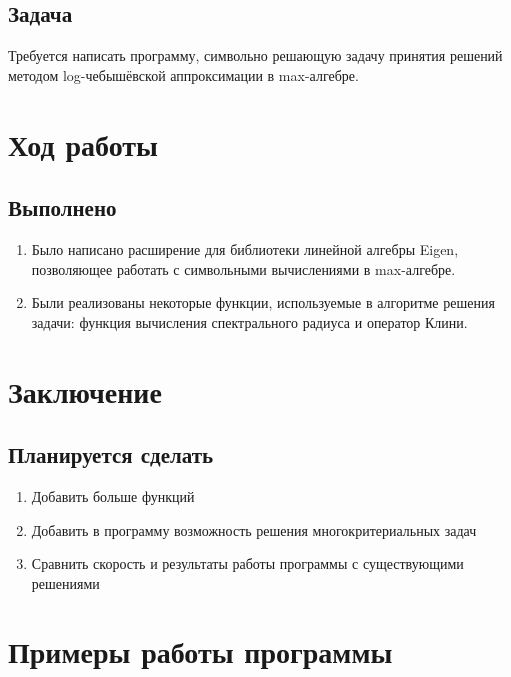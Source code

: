 \documentclass[specialist,
  substylefile = spbu.rtx,
  href,
  colorlinks=true,
  12pt]{disser}
\begin{document}
\section{Задача}
  Требуется написать программу, символьно решающую задачу принятия решений методом log-чебышёвской аппроксимации в max-алгебре.

\chapter{Ход работы}
\section{Выполнено}
  \begin{enumerate}
    \item Было написано расширение для библиотеки линейной алгебры Eigen, позволяющее работать с символьными вычислениями в max-алгебре.
    \item Были реализованы некоторые функции, используемые в алгоритме решения задачи: функция вычисления спектрального радиуса и оператор Клини.
  \end{enumerate}

\chapter{Заключение}
\section{Планируется сделать}
  \begin{enumerate}
    \item Добавить больше функций
    \item Добавить в программу возможность решения многокритериальных задач
    \item Сравнить скорость и результаты работы программы с существующими решениями
  \end{enumerate}

\appendix
\cleardoublepage\makeatletter\@openrightfalse\makeatother
\chapter{Примеры работы программы}
\end{document}
